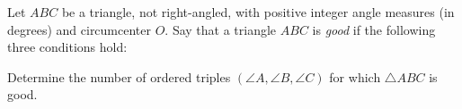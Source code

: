 Let $ABC$ be a triangle, not right-angled, with positive integer angle measures (in degrees) and circumcenter $O$. Say that a triangle $ABC$ is \emph{good} if the following three conditions hold:

\begin{itemize}


\end{itemize}

Determine the number of ordered triples $(\angle A, \angle B,\angle C)$ for which $\triangle ABC$ is good.
